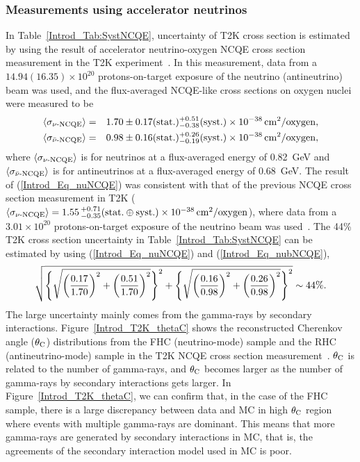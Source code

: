 \subsubsection{Measurements using accelerator neutrinos}
\vs\hs
In Table~\ref{Introd_Tab:SystNCQE}, uncertainty of T2K cross section is estimated by using the result of accelerator neutrino-oxygen NCQE cross section measurement in the T2K experiment~\cite{2019Abe}.
In this measurement, data from a $14.94(16.35) \times 10^{20}$ protons-on-target exposure of the neutrino (antineutrino) beam was used, and the flux-averaged NCQE-like cross sections on oxygen nuclei were measured to be
\begin{eqnarray}
	\langle \sigma_{\rm \nu\mathchar`-NCQE} \rangle       &=& 1.70 \pm 0.17({\rm stat.}) ^{+0.51}_{-0.38}({\rm syst.}) \times 10^{-38}\,{\rm cm}^{2}/{\rm oxygen}, \label{Introd_Eq_nuNCQE} \\
	\langle \sigma_{\rm \bar{\nu}\mathchar`-NCQE} \rangle &=& 0.98 \pm 0.16({\rm stat.}) ^{+0.26}_{-0.19}({\rm syst.}) \times 10^{-38}\,{\rm cm}^{2}/{\rm oxygen}, \label{Introd_Eq_nubNCQE}
\end{eqnarray}
where $\langle \sigma_{\rm \nu\mathchar`-NCQE} \rangle$ is for neutrinos at a flux-averaged energy of 0.82~GeV and $\langle \sigma_{\rm \bar{\nu}\mathchar`-NCQE} \rangle$ is for antineutrinos at a flux-averaged energy of 0.68~GeV.
The result of (\ref{Introd_Eq_nuNCQE}) was consistent with that of the previous NCQE cross section measurement in T2K ($\langle \sigma_{\rm \nu\mathchar`-NCQE} \rangle = 1.55\,^{+0.71}_{-0.35}({\rm stat.} \oplus {\rm syst.}) \times 10^{-38}\,{\rm cm}^{2}/{\rm oxygen}$), where data from a $3.01 \times 10^{20}$ protons-on-target exposure of the neutrino beam was used~\cite{2014Abe}.
The 44\% T2K cross section uncertainty in Table~\ref{Introd_Tab:SystNCQE} can be estimated by using (\ref{Introd_Eq_nuNCQE}) and (\ref{Introd_Eq_nubNCQE}),
\begin{eqnarray}
	\sqrt{\Bigg\{\sqrt{\bigg({0.17 \over 1.70}\bigg)^{2} + \bigg({0.51 \over 1.70}\bigg)^{2}}\Bigg\}^{2} + \Bigg\{\sqrt{\bigg({0.16 \over 0.98}\bigg)^{2} + \bigg({0.26 \over 0.98}\bigg)^{2}}\Bigg\}^{2}} \sim 44\%.
\end{eqnarray}
\hs
The large uncertainty mainly comes from the gamma-rays by secondary interactions.
Figure~\ref{Introd_T2K_thetaC} shows the reconstructed Cherenkov angle ($\theta_{\rm C}$) distributions from the FHC (neutrino-mode) sample and the RHC (antineutrino-mode) sample in the T2K NCQE cross section measurement~\cite{2019Abe}.
$\theta_{\rm C}$ is related to the number of gamma-rays, and $\theta_{\rm C}$ becomes larger as the number of gamma-rays by secondary interactions gets larger.
In Figure~\ref{Introd_T2K_thetaC}, we can confirm that, in the case of the FHC sample, there is a large discrepancy between data and MC in high $\theta_{\rm C}$ region where events with multiple gamma-rays are dominant.
This means that more gamma-rays are generated by secondary interactions in MC, that is, the agreements of the secondary interaction model used in MC is poor.

